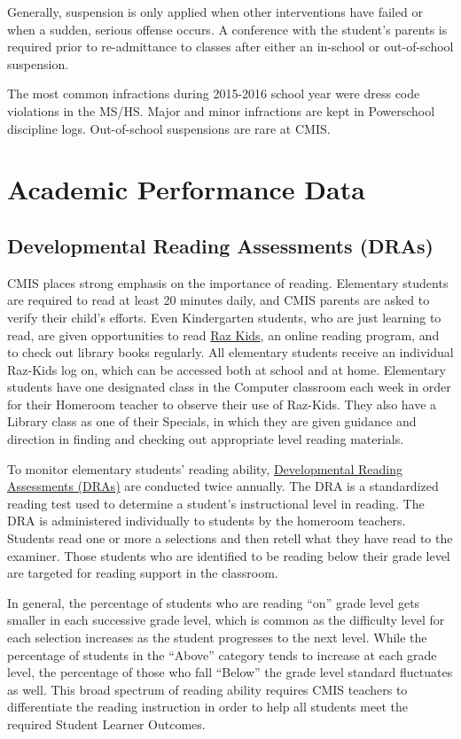 Generally, suspension is only applied when other interventions have failed or when a sudden, serious offense occurs. A conference with the student’s parents is required prior to re-admittance to classes after either an in-school or out-of-school suspension. 

The most common infractions during 2015-2016 school year were dress code violations in the MS/HS.  Major and minor infractions are kept in Powerschool discipline logs. Out-of-school suspensions are rare at CMIS.

\section{Academic Performance Data}

\subsection{Developmental Reading Assessments (DRAs)}

CMIS places strong emphasis on the importance of reading.  Elementary students are required to read at least 20 minutes daily, and CMIS parents are asked to verify their child’s efforts.  Even Kindergarten students, who are just learning to read, are given opportunities to read \href{https://www.raz-kids.com/}{Raz Kids}, an online reading program, and to check out library books regularly.  All elementary students receive an individual Raz-Kids log on, which can be accessed both at school and at home.  Elementary students have one designated class in the Computer classroom each week in order for their Homeroom teacher to observe their use of Raz-Kids.  They also have a Library class as one of their Specials, in which they are given guidance and direction in finding and checking out appropriate level reading materials.  

To monitor elementary students’ reading ability, \href{https://drive.google.com/open?id=0ByVFfrm0zfolV29lcmM1WXVQOXc}{Developmental Reading Assessments (DRAs)} are conducted twice annually.  The DRA is a standardized reading test used to determine a student’s instructional level in reading. The DRA is administered individually to students by the homeroom teachers. Students read one or more a selections and then retell what they have read to the examiner. Those students who are identified to be reading below their grade level are targeted for reading support in the classroom. 

In general, the percentage of students who are reading “on” grade level gets smaller in each successive grade level, which is common as the difficulty level for each selection increases as the student progresses to the next level. While the percentage of students in the “Above” category tends to increase at each grade level, the percentage of those who fall “Below” the grade level standard fluctuates as well. This broad spectrum of reading ability requires CMIS teachers to differentiate the reading instruction in order to help all students meet the required Student Learner Outcomes.  

